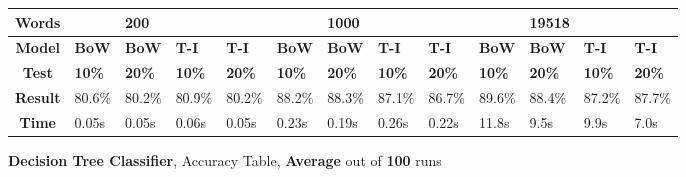 \documentclass{article}
\begin{document}
	\begin{figure}[H]
		\begin{tabular}{||c||l|l|l|l||l|l|l|l||l|l|l|l||}
			\hline
			\textbf{Words} &  & \textbf{200} & & & &\textbf{1000} & & & & \textbf{19518} &  & \\ \hline 
			\textbf{Model} & \textbf{BoW} & \textbf{BoW} & \textbf{T-I} & \textbf{T-I} &\textbf{BoW} & \textbf{BoW} & \textbf{T-I} & \textbf{T-I} & \textbf{BoW} & \textbf{BoW} & \textbf{T-I} & \textbf{T-I}\\ \hline
			\textbf{Test} & \textbf{10\%} & \textbf{20\%} & \textbf{10\%} & \textbf{20\%} & \textbf{10\%} & \textbf{20\%} & \textbf{10\%} & \textbf{20\%} & \textbf{10\%} & \textbf{20\%} & \textbf{10\%} & \textbf{20\%} \\ \hline \hline  
			\textbf{Result} & 80.6\% & 80.2\% & 80.9\% & 80.2\% & 88.2\% & 88.3\% & 87.1\% & 86.7\% & 89.6\% & 88.4\% & 87.2\% & 87.7\% \\ \hline 
			\textbf{Time} & 0.05s & 0.05s & 0.06s & 0.05s & 0.23s & 0.19s & 0.26s & 0.22s & 11.8s & 9.5s & 9.9s & 7.0s \\ \hline 
		\end{tabular}
		\caption{\textbf{Decision Tree Classifier}, Accuracy Table, \textbf{Average} out of \textbf{100} runs}
	\end{figure}
\end{document}
